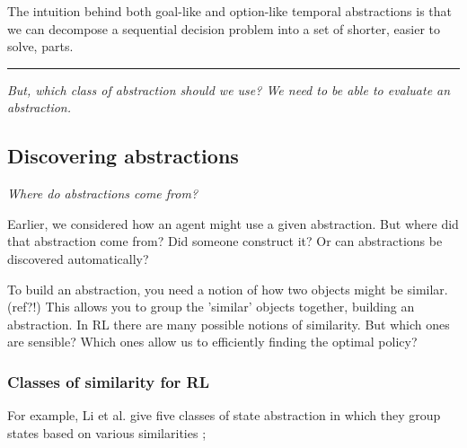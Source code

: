 The intuition behind both goal-like and option-like temporal abstractions is that
we can decompose a sequential decision problem into a set of shorter, easier to solve, parts.

\begin{center}\rule{0.5\linewidth}{\linethickness}\end{center}

\begin{displayquote}
\textit{But, which class of abstraction should we use? We need to be able to evaluate an abstraction.}
\end{displayquote}

\subsection{Discovering abstractions}

\begin{displayquote}
  \textit{Where do abstractions come from?}
\end{displayquote}

Earlier, we considered how an agent might use a given abstraction.
But where did that abstraction come from? Did someone construct it?
Or can abstractions be discovered automatically?

To build an abstraction, you need a notion of how two objects might be similar. {\color{red}(ref?!)}
This allows you to group the 'similar' objects together, building an abstraction.
In RL there are many possible notions of similarity. But which ones are sensible?
Which ones allow us to efficiently finding the optimal policy?

\vspace{5mm}

\subsubsection{Classes of similarity for RL}

For example, Li et al. give five classes of
state abstraction in which they group states based on various similarities \footnotemark[20];

